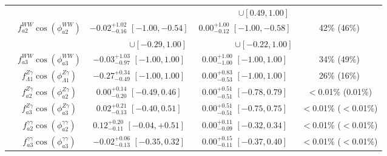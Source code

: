 \begin{table}
\begin{tabular}{ccccccc}
& & \multicolumn{2}{c}{ }     & \multicolumn{2}{c}{~~~~~~~~~$\cup  [0.49,1.00]$}   &    \\
& $f_{a2}^{WW}\cos(\phi_{a2}^{WW})$         & \multicolumn{2}{c}{$-0.02^{+1.02}_{-0.16}$ $ [-1.00, -0.54]$}     & \multicolumn{2}{c}{$0.00^{+1.00}_{-0.12}$ $[-1.00, -0.58]$}
& 42\% (46\%)             \\
 &  & \multicolumn{2}{c}{~~~~~~~~~$\cup  [-0.29,1.00]$}     & \multicolumn{2}{c}{~~~~~~~~~$\cup  [-0.22,1.00]$}   &     \\
& $f_{a3}^{WW}\cos(\phi_{a3}^{WW})$         & \multicolumn{2}{c}{$-0.03^{+1.03}_{-0.97}$ $ [-1.00,1.00] $} & \multicolumn{2}{c}{$0.00^{+1.00}_{-1.00}$ $ [-1.00,1.00] $}
& 34\% (49\%)        \\
& $f_{\Lambda1}^{Z\gamma}\cos(\phi_{\Lambda1}^{Z\gamma})$        & \multicolumn{2}{c}{$-0.27^{+0.34}_{-0.49}$ $ [-1.00,1.00] $}          & \multicolumn{2}{c}{$0.00^{+0.83}_{-0.53}$ $[-1.00,1.00] $}
& 26\% (16\%)                                              \\
& $f_{a2}^{Z\gamma}\cos(\phi_{a2}^{Z\gamma})$          & \multicolumn{2}{c}{$0.00^{+0.14}_{-0.20}$ $[-0.49,0.46]$} &   \multicolumn{2}{c}{$0.00^{+0.51}_{-0.51}$ $[-0.78,0.79]$}
& $<$0.01\% (0.01\%)         \\
& $f_{a3}^{Z\gamma}\cos(\phi_{a3}^{Z\gamma})$           & \multicolumn{2}{c}{$0.02^{+0.21}_{-0.13}$ $[-0.40,0.51]$} &   \multicolumn{2}{c}{$0.00^{+0.51}_{-0.51}$ $[-0.75,0.75]$}
& $<$0.01\% ($<$0.01\%)         \\
 & $f_{a2}^{\gamma\gamma}\cos(\phi_{a2}^{\gamma\gamma})$    & \multicolumn{2}{c}{$0.12_{-0.11}^{+0.20}$ $[-0.04,+0.51]$} &   \multicolumn{2}{c}{$0.00_{-0.09}^{+0.11}$ $[-0.32,0.34]$}
& $<$0.01\% ($<$0.01\%)        \\
& $f_{a3}^{\gamma\gamma}\cos(\phi_{a3}^{\gamma\gamma})$    & \multicolumn{2}{c}{$-0.02_{-0.13}^{+0.06}$ $[-0.35,0.32]$} &   \multicolumn{2}{c}{$0.00_{-0.11}^{+0.15}$ $[-0.37,0.40]$}
& $<$0.01\% ($<$0.01\%)        \\
\end{tabular}
\label{tab:summary_spin0}
\end{table}

